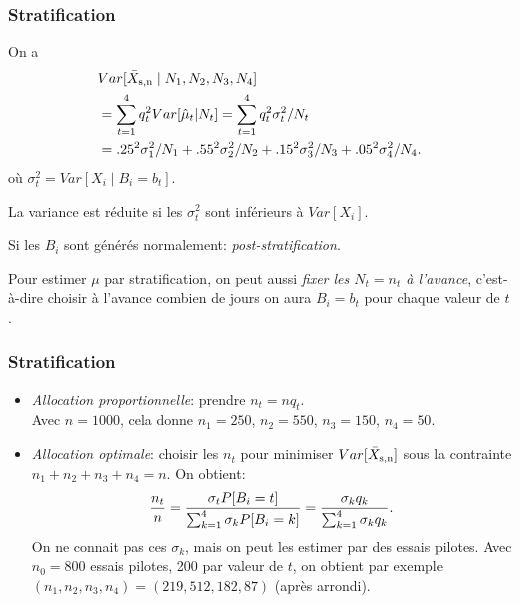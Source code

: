 \documentclass[t,usepdftitle=false]{beamer}
\begin{document}
\begin{frame}
	\frametitle{Stratification}
	
	On a 
	\begin{align*}
		&  Var[\bar X_{\rm{s},n} \mid N_1, N_2, N_3, N_4] \\
		&= \sum_{t=1}^4 q_t^2 Var[\hat\mu_t | N_t]  
		= \sum_{t=1}^4 q_t^2 \sigma^2_t/N_t \\
		&= .25^2 \sigma^2_1/N_1 + .55^2 \sigma^2_2/N_2 + 
		.15^2 \sigma^2_3/N_3 + .05^2 \sigma^2_4/N_4.
	\end{align*}
	o\`u ${\sigma^2_t} = Var[X_i\mid B_i=b_t]$.
	
	\mbox{}
	
	La variance est réduite si les $\sigma_t^2$ sont inférieurs \`a $Var[X_i]$.
	
	\mbox{}
	
	Si les $B_i$ sont générés normalement: \emph{post-stratification}.
	
	\mbox{}
	
	Pour estimer $\mu$ par stratification, on peut aussi 
	\emph{fixer les $N_t = n_t$ \`a l'avance}, c'est-\`a-dire choisir \`a
	l'avance combien de jours on aura $B_i = b_t$ pour chaque valeur de
	$t$.
	
\end{frame}

\begin{frame}
	\frametitle{Stratification}
	
	\begin{itemize}
		\item
		\emph{Allocation proportionnelle}: prendre ${n_t} = n q_t$.\\
		Avec $n=1000$, cela donne $n_1 = 250$, $n_2 = 550$, $n_3 = 150$, $n_4
		= 50$.
		\item
		\emph{Allocation optimale}: 
		choisir les $n_t$ pour minimiser $Var[\bar X_{\rm{s},n}]$ sous la contrainte
		$n_1+n_2+n_3+n_4=n$.  On obtient:
		\[
		\frac{{n_t}}{n} 
		= {\sigma_t P[B_i=t] \over\sum_{k=1}^4 \sigma_k P[B_i=k]}
		= {\sigma_k q_k \over\sum_{k=1}^4 \sigma_k q_k}.
		\]
		On ne connait pas ces $\sigma_k$, mais on peut les estimer par des 
		essais pilotes.
		Avec ${n_0=800}$ essais pilotes, 200 par valeur de $t$, on obtient par
		exemple $(n_1, n_2, n_3, n_4) = (219, 512, 182, 87)$ (après arrondi). 
	\end{itemize}
	
\end{frame}
\end{document}
